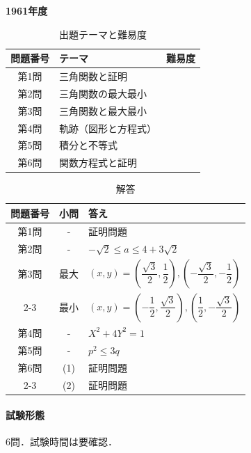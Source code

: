 \documentclass[../../main.tex]{subfiles}
\begin{document}
\begin{center}
  {\fontsize{48pt}{58pt}\selectfont \textbf{1961}\normalsize\textbf{年度}}
\end{center}

\begin{table}[htb]
  \centering
  \caption{出題テーマと難易度}
  \begin{tabular}{|c|p{9cm}|c|}
    \hline
    \textbf{問題番号} & \textbf{テーマ} & \textbf{難易度} \\
    \hline
    第1問 & 三角関数と証明 & \\
    \hline
    第2問 & 三角関数の最大最小 & \\
    \hline
    第3問 & 三角関数と最大最小 & \\
    \hline
    第4問 & 軌跡（図形と方程式） & \\
    \hline
    第5問 & 積分と不等式 & \\
    \hline
    第6問 & 関数方程式と証明 & \\
    \hline
  \end{tabular}
\end{table}

\begin{table}[htb]
  \centering
  \caption{解答}
  \renewcommand{\arraystretch}{1.4}
  \begin{tabular}{|c|c|p{9cm}|}
    \hline
    \textbf{問題番号} & \textbf{小問} & \textbf{答え} \\
    \hline
    第1問 & - & 証明問題 \\
    \hline
    第2問 & - & $-\sqrt{2} \le a \le 4+3\sqrt{2}$ \\
    \hline
    第3問 & 最大 & $(x,y)=\left(\dfrac{\sqrt{3}}{2},\dfrac{1}{2}\right),\left(-\dfrac{\sqrt{3}}{2},-\dfrac{1}{2}\right)$ \\
    \cline{2-3}
    & 最小 & $(x,y)=\left(-\dfrac{1}{2},\dfrac{\sqrt{3}}{2}\right),\left(\dfrac{1}{2},-\dfrac{\sqrt{3}}{2}\right)$ \\
    \hline
    第4問 & - & $X^2+4Y^2=1$ \\
    \hline
    第5問 & - & $p^2 \le 3q$ \\
    \hline
    第6問 & (1) & 証明問題 \\
    \cline{2-3}
    & (2) & 証明問題 \\
    \hline
  \end{tabular}
\end{table}

\paragraph{試験形態}
6問．試験時間は要確認．
\end{document}
